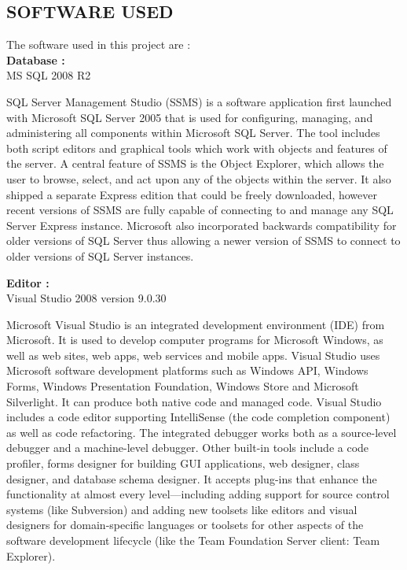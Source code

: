 \documentclass[14pt]{article} %
\begin{document}
 \subsection{SOFTWARE USED}
 \noindent The software used in this project are :\\
\indent \textbf{Database :}\\
\indent MS SQL 2008 R2 \\ \par
  SQL Server Management Studio (SSMS) is a software application first launched with Microsoft SQL Server 2005 that is used for configuring, managing, and administering all components within Microsoft SQL Server. The tool includes both script editors and graphical tools which work with objects and features of the server.
A central feature of SSMS is the Object Explorer, which allows the user to browse, select, and act upon any of the objects within the server. It also shipped a separate Express edition that could be freely downloaded, however recent versions of SSMS are fully capable of connecting to and manage any SQL Server Express instance. Microsoft also incorporated backwards compatibility for older versions of SQL Server thus allowing a newer version of SSMS to connect to older versions of SQL Server instances.\\  \par
\textbf{Editor :}\\
\indent Visual Studio 2008 version 9.0.30\\ \par
Microsoft Visual Studio is an integrated development environment (IDE) from Microsoft. It is used to develop computer programs for Microsoft Windows, as well as web sites, web apps, web services and mobile apps. Visual Studio uses Microsoft software development platforms such as Windows API, Windows Forms, Windows Presentation Foundation, Windows Store and Microsoft Silverlight. It can produce both native code and managed code.
Visual Studio includes a code editor supporting IntelliSense (the code completion component) as well as code refactoring. The integrated debugger works both as a source-level debugger and a machine-level debugger. Other built-in tools include a code profiler, forms designer for building GUI applications, web designer, class designer, and database schema designer. It accepts plug-ins that enhance the functionality at almost every level—including adding support for source control systems (like Subversion) and adding new toolsets like editors and visual designers for domain-specific languages or toolsets for other aspects of the software development lifecycle (like the Team Foundation Server client: Team Explorer).\\  \par
\end{document}
